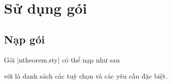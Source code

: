 \section{Sử dụng gói}


\subsection{Nạp gói}

Gói |ntheorem.sty| có thể nạp như sau
\begin{command}
  \usepackage[`']{ntheorem}
\end{command}
với  là danh sách các tuỳ chọn và các yêu cầu đặc biệt.

